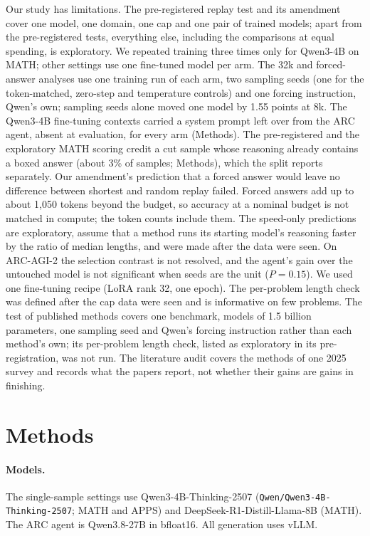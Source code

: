 \documentclass[10pt]{article}
\begin{document}
Our study has limitations. The pre-registered replay test and its amendment cover one model, one domain, one cap and one pair of trained models; apart from the pre-registered tests, everything else, including the comparisons at equal spending, is exploratory. We repeated training three times only for Qwen3-4B on MATH; other settings use one fine-tuned model per arm. The 32k and forced-answer analyses use one training run of each arm, two sampling seeds (one for the token-matched, zero-step and temperature controls) and one forcing instruction, Qwen's own; sampling seeds alone moved one model by 1.55 points at 8k. The Qwen3-4B fine-tuning contexts carried a system prompt left over from the ARC agent, absent at evaluation, for every arm (Methods). The pre-registered and the exploratory MATH scoring credit a cut sample whose reasoning already contains a boxed answer (about 3\% of samples; Methods), which the split reports separately. Our amendment's prediction that a forced answer would leave no difference between shortest and random replay failed. Forced answers add up to about 1{,}050 tokens beyond the budget, so accuracy at a nominal budget is not matched in compute; the token counts include them. The speed-only predictions are exploratory, assume that a method runs its starting model's reasoning faster by the ratio of median lengths, and were made after the data were seen. On ARC-AGI-2 the selection contrast is not resolved, and the agent's gain over the untouched model is not significant when seeds are the unit ($P=0.15$). We used one fine-tuning recipe (LoRA rank 32, one epoch). The per-problem length check was defined after the cap data were seen and is informative on few problems. The test of published methods covers one benchmark, models of 1.5 billion parameters, one sampling seed and Qwen's forcing instruction rather than each method's own; its per-problem length check, listed as exploratory in its pre-registration, was not run. The literature audit covers the methods of one 2025 survey and records what the papers report, not whether their gains are gains in finishing.

\section{Methods}
\paragraph{Models.} The single-sample settings use Qwen3-4B-Thinking-2507 (\texttt{Qwen/Qwen3-4B-Thinking-2507}; MATH and APPS) and DeepSeek-R1-Distill-Llama-8B\cite{guo2025deepseekr1} (MATH). The ARC agent is Qwen3.8-27B\cite{qwen38card} in bfloat16. All generation uses vLLM\cite{kwon2023vllm}.
\end{document}
